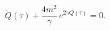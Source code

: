 \begin{equation}\label{m-Liouville}
\ddot{Q}(\tau) +\frac{4m^2}{\gamma}\, e^{2\gamma Q(\tau)}=0.
\end{equation}

